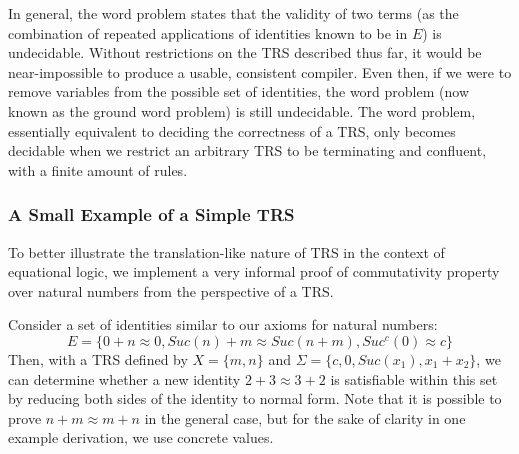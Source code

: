 \documentclass{article}
\begin{document}
In general, the word problem states that the validity of two terms (as the combination of repeated applications of identities known to be in $E$) is undecidable.
Without restrictions on the TRS described thus far,
it would be near-impossible to produce a usable, consistent compiler.
Even then, if we were to remove variables from the possible set of identities,
the word problem (now known as the ground word problem) is still undecidable.
The word problem, essentially equivalent to deciding the correctness of a TRS,
only becomes decidable when we restrict an arbitrary TRS to be terminating and confluent, with a finite amount of rules.


\subsubsection{A Small Example of a Simple TRS}

To better illustrate the translation-like nature of TRS in the context of equational logic, we implement a very informal proof of commutativity property
over natural numbers from the perspective of a TRS.

Consider a set of identities similar to our axioms for natural numbers:
\[E = \{0 + n \approx 0, Suc(n) + m \approx Suc(n + m), Suc^c(0) \approx c\}\]
Then, with a TRS defined by $X = \{m,n\}$ and $\Sigma = \{c,0, Suc(x_1), x_1 + x_2\}$,
we can determine whether a new identity $2 + 3 \approx 3 + 2$
is satisfiable within this set by reducing both sides of the identity to normal form.
Note that it is possible to prove $n + m \approx m + n$ in the general case, but for the sake of clarity in one example derivation,
we use concrete values.
\end{document}
